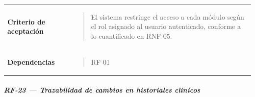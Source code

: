 \documentclass[
]{article}
\begin{document}
{\begin{longtable}[]{@{}
  >{\raggedright\arraybackslash}p{}
  >{\raggedright\arraybackslash}p{}@{}}
\textbf{Criterio de aceptación} &
\begin{minipage}[t]{\linewidth}\raggedright
\begin{quote}
El sistema restringe el acceso a cada módulo según el rol asignado al
usuario autenticado, conforme a lo cuantificado en RNF-05.
\end{quote}
\end{minipage} \\
\textbf{Dependencias} & \begin{minipage}[t]{\linewidth}\raggedright
\begin{quote}
RF-01
\end{quote}
\end{minipage} \\
\end{longtable}
}

\subparagraph{RF-23 --- Trazabilidad de cambios en historiales
clínicos}\label{rf-23-trazabilidad-de-cambios-en-historiales-cluxednicos}
\end{document}
